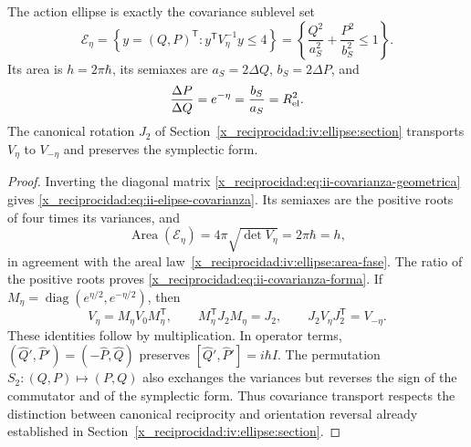 \begin{proposition}
\label{x_reciprocidad:prop:ii-area-covarianza-reciprocidad}
The action ellipse is exactly the covariance sublevel set
\begin{equation}
 \mathcal E_\eta
 =\left\{y=(Q,P)^{\mathsf T}:y^{\mathsf T}V_\eta^{-1}y\leq4\right\}
 =\left\{\frac{Q^2}{a_S^2}+\frac{P^2}{b_S^2}\leq1\right\}.
 \label{x_reciprocidad:eq:ii-elipse-covarianza}
\end{equation}
Its area is \(h=2\pi\hbar\), its semiaxes are
\(a_S=2\Delta Q\), \(b_S=2\Delta P\), and
\begin{equation}
 \frac{\Delta P}{\Delta Q}=e^{-\eta}
 =\frac{b_S}{a_S}=R_{\rm el}^2.
 \label{x_reciprocidad:eq:ii-covarianza-forma}
\end{equation}
The canonical rotation \(J_2\) of Section~\ref{x_reciprocidad:iv:ellipse:section} transports
\(V_\eta\) to \(V_{-\eta}\) and preserves the symplectic form.
\end{proposition}

\begin{proof}
Inverting the diagonal matrix
\eqref{x_reciprocidad:eq:ii-covarianza-geometrica} gives
\eqref{x_reciprocidad:eq:ii-elipse-covarianza}. Its semiaxes are the positive roots of
four times its variances, and
\[
 \operatorname{Area}(\mathcal E_\eta)
 =4\pi\sqrt{\det V_\eta}=2\pi\hbar=h,
\]
in agreement with the areal law~\eqref{x_reciprocidad:iv:ellipse:area-fase}.
The ratio of the positive roots proves
\eqref{x_reciprocidad:eq:ii-covarianza-forma}.
If \(M_\eta=\operatorname{diag}(e^{\eta/2},e^{-\eta/2})\), then
\[
 V_\eta=M_\eta V_0M_\eta^{\mathsf T},\qquad
 M_\eta^{\mathsf T}J_2M_\eta=J_2,\qquad
 J_2V_\eta J_2^{\mathsf T}=V_{-\eta}.
\]
These identities follow by multiplication. In operator terms,
\((\widehat Q',\widehat P')=(-\widehat P,\widehat Q)\) preserves
\([\widehat Q',\widehat P']=i\hbar I\). The permutation
\(S_2:(Q,P)\mapsto(P,Q)\) also exchanges the variances but reverses
the sign of the commutator and of the symplectic form. Thus covariance
transport respects the distinction between canonical reciprocity and
orientation reversal already established in Section~\ref{x_reciprocidad:iv:ellipse:section}.
\end{proof}

